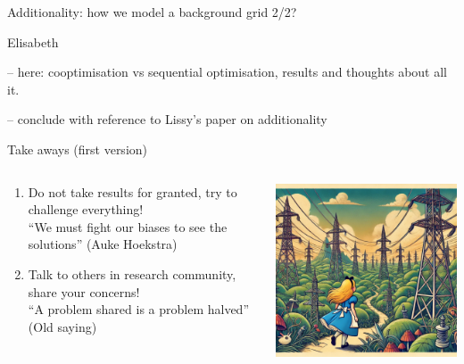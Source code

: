 \begin{frame}{Additionality: how we model a background grid 2/2?}

  Elisabeth

  -- here: cooptimisation vs sequential optimisation, results and thoughts about all it.

  -- conclude with reference to Lissy's paper on additionality

\end{frame}


\begin{frame}{Take aways (first version)}

\begin{columns}
\begin{column}{7cm}
  \begin{enumerate}
    \item Do not take results for granted, try to challenge everything! \\
    \enquote{We must fight our biases to see the solutions} (Auke Hoekstra)
    \item Talk to others in research community, share your concerns! \\
    \enquote{A problem shared is a problem halved} (Old saying)
  \end{enumerate}
\end{column}
\begin{column}{8cm}
  \includegraphics[width=8cm]{images/alice.png}
\end{column}
\end{columns}


\end{frame}


